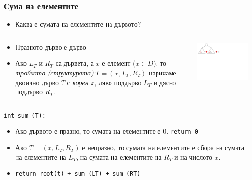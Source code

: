 \documentclass{beamer}
\begin{document}
\begin{frame}[fragile]
\frametitle{Сума на елементите}

    \begin{itemize}
      \item Каква е сумата на елементите на дървото?
    \end{itemize}


\begin{columns}[t]
  \begin{column}{0.65\textwidth}

    \begin{flushleft}
    \begin{itemize}
      \item Празното дърво е дърво
      \item Ако $L_T$ и $R_T$ са дървета, а $x$ е елемент ($x \in D$), то \emph{тройката (структурата)} $T=(x,L_T,R_T)$ наричаме двоично дърво $T$ с \emph{корен} $x$, ляво поддърво $L_T$ и дясно поддърво $R_T$.
    \end{itemize}
    \end{flushleft}

  \end{column}
  \begin{column}{0.35\textwidth}

    \includegraphics[width=8cm]{images/tree_recursive_op_sum}

  \end{column}
\end{columns}

\vspace{-100px}

 \texttt{int sum (T):}

    \begin{itemize}
      \item Ако дървото е празно, то сумата на елементите е $0$. \texttt{return 0}
      \item  Ако $T=(x,L_T,R_T)$ е непразно, то сумата на елементите е сбора на сумата на елементите на $L_T$, на сумата на елементите на $R_T$ и на числото $x$.
      \item \texttt{return root(t) + sum (LT) + sum (RT)}
    \end{itemize}

\end{frame}
\end{document}
